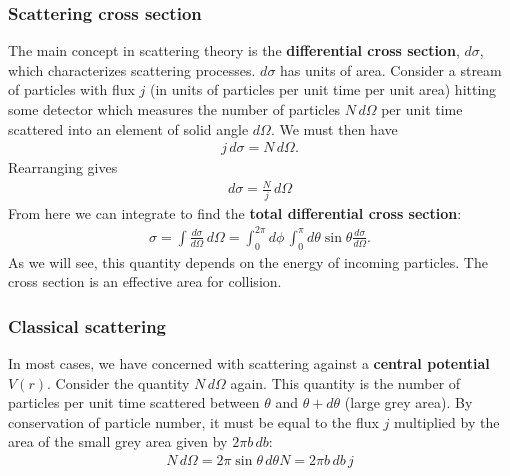 \documentclass{book}
\theoremstyle{definition}
\newcommand{\f}[2]{\frac{#1}{#2}}
\begin{document}
\subsubsection{Scattering cross section}


The main concept in scattering theory is the \textbf{differential cross section}, $d\sigma$, which characterizes scattering processes. $d\sigma$ has units of area. Consider a stream of particles with flux $j$ (in units of particles per unit time per unit area) hitting some detector which measures the number of particles $N\,d\Omega$ per unit time scattered into an element of solid angle $d\Omega$. We must then have
\begin{align*}
	j\,d\sigma = N\, d\Omega.
\end{align*}
Rearranging gives
\begin{align*}
	d\sigma = \f{N}{j}\, d\Omega
\end{align*}
From here we can integrate to find the \textbf{total differential cross section}:
\begin{align*}
	\sigma = \int \f{d\sigma}{d\Omega} \,d\Omega = \int_0^{2\pi}d\phi\, \int_0^\pi d\theta \sin\theta \f{d\sigma}{d\Omega}.
\end{align*}
As we will see, this quantity depends on the energy of incoming particles. The cross section is an effective area for collision.

\subsubsection{Classical scattering}

In most cases, we have concerned with scattering against a \textbf{central potential} $V(r)$. Consider the quantity $N\,d\Omega$ again. This quantity is the number of particles per unit time scattered between $\theta$ and $\theta+d\theta$ (large grey area). By conservation of particle number, it must be equal to the flux $j$ multiplied by the area of the small grey area given by $2\pi b \,db$:
\begin{align*}
	N\,d\Omega = 2\pi \sin\theta\,d\theta N = 2\pi b\,db \,j
\end{align*}  
\end{document}
